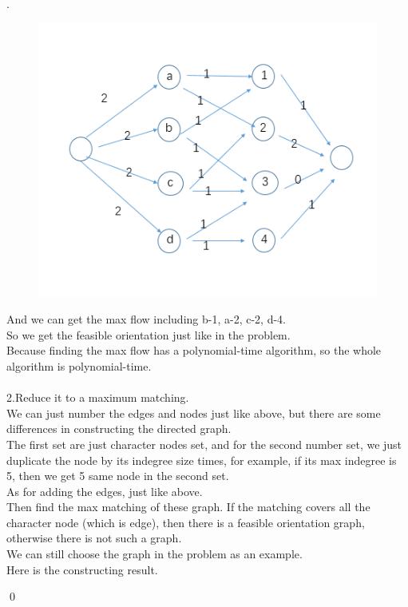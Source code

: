 \documentclass[12pt, notitlepage]{article}
\newenvironment{sol}
  {\par\vspace{3mm}\noindent{\it Solution}.}{\qed}
\begin{document}
\begin{sol}
\begin{figure}[H]
	\caption{} \nonumber\label{fig:first graph}\vspace{-10pt}
    \end{figure}
    \begin{figure}[H]
	\center
	\includegraphics[width=0.6\linewidth]{6-2.png}\vspace{-10pt}
	\caption{} \nonumber\label{fig:second graph}\vspace{-10pt}
    \end{figure}
    And we can get the max flow including b-1, a-2, c-2, d-4.\\So we get the feasible orientation just like in the problem.\\
    Because finding the max flow has a polynomial-time algorithm, so the whole algorithm is polynomial-time.\\
    \\2.Reduce it to a maximum matching.\\
    We can just number the edges and nodes just like above, but there are some differences in constructing the directed graph.\\
    The first set are just character nodes set, and for the second number set, we just duplicate the node by its indegree size times, for example, if its max indegree is 5, then we get 5 same node in the second set. \\
    As for adding the edges, just like above.\\
    Then find the max matching of these graph. If the matching covers all the character node (which is edge), then there is a feasible orientation graph, otherwise there is not such a graph.\\
    We can still choose the graph in the problem as an example.\\
    Here is the constructing result.\\
    \begin{figure}[H]
	\center

\end{figure}
\end{sol}
\end{document}
